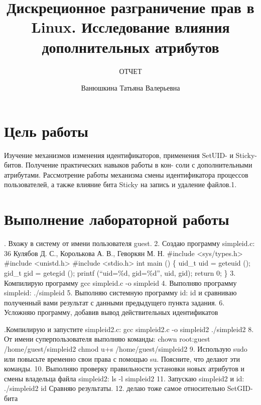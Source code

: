 \documentclass[
  12pt,
  a4paper,
  DIV=11,
  numbers=noendperiod]{scrreprt}
\title{Дискреционное разграничение прав в Linux. Исследование влияния
дополнительных атрибутов}
\subtitle{ОТЧЕТ}
\author{Ванюшкина Татьяна Валерьевна}
\date{}
\renewcommand*\contentsname{Содержание}
\newcommand\contentsname{Содержание}
\begin{document}
\maketitle

\renewcommand*\contentsname{Содержание}
{
\setcounter{tocdepth}{1}
\tableofcontents
}
\listoffigures
\listoftables

\chapter{Цель
работы}\label{ux446ux435ux43bux44c-ux440ux430ux431ux43eux442ux44b}

Изучение механизмов изменения идентификаторов, применения SetUID- и
Sticky-битов. Получение практических навыков работы в кон- соли с
дополнительными атрибутами. Рассмотрение работы механизма смены
идентификатора процессов пользователей, а также влияние бита Sticky на
запись и удаление файлов.1.

\chapter{Выполнение лабораторной
работы}\label{ux432ux44bux43fux43eux43bux43dux435ux43dux438ux435-ux43bux430ux431ux43eux440ux430ux442ux43eux440ux43dux43eux439-ux440ux430ux431ux43eux442ux44b}

. Вхожу в систему от имени пользователя guest. 2. Создаю программу
simpleid.c: 36 Кулябов Д. С., Королькова А. В., Геворкян М. Н. \#include
\textless sys/types.h\textgreater{} \#include
\textless unistd.h\textgreater{} \#include
\textless stdio.h\textgreater{} int main () \{ uid\_t uid = geteuid ();
gid\_t gid = getegid (); printf (\enquote{uid=\%d, gid=\%d\n}, uid,
gid); return 0; \} 3. Компилирую программу gcc simpleid.c -o simpleid 4.
Выполняю программу simpleid: ./simpleid 5. Выполняю системную программу
id: id и сравниваю полученный вами результат с данными предыдущего
пункта задания. 6. Усложняю программу, добавив вывод действительных
идентификатов

.Компилирую и запустите simpleid2.c: gcc simpleid2.c -o simpleid2
./simpleid2 8. От имени суперпользователя выполняю команды: chown
root:guest /home/guest/simpleid2 chmod u+s /home/guest/simpleid2 9.
Использую sudo или повысьте временно свои права с помощью su. Поясните,
что делают эти команды. 10. Выполняю проверку правильности установки
новых атрибутов и смены владельца файла simpleid2: ls -l simpleid2 11.
Запускаю simpleid2 и id: ./simpleid2 id Сравняю результаты. 12. делаю
тоже самое относительно SetGID-бита
\end{document}
